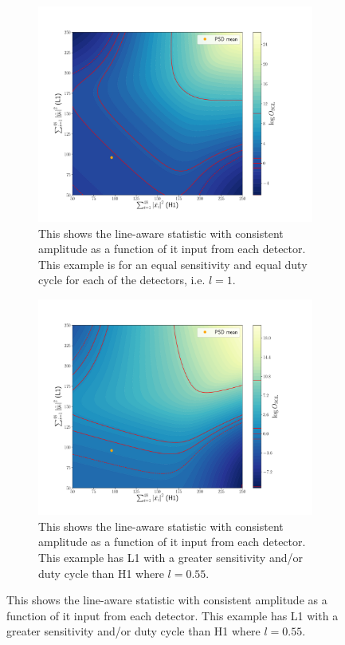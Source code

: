 \begin{figure}
\centering

\begin{subfigure}[h]{\linewidth}
\begin{minipage}{0.65\linewidth}
\includegraphics[width=0.9\linewidth]{C3_soap/lookup_3d_2.pdf}
\end{minipage}\hfill
\begin{minipage}{0.35\linewidth}
\caption{This shows the line-aware statistic with consistent amplitude as a function of it input from each detector. This example is for an equal sensitivity and equal duty cycle for each of the detectors, i.e. $l=1$.}
\label{soap:lineawareamp:plot:noline}
\end{minipage}
\end{subfigure}
\begin{subfigure}[h]{\linewidth}
\begin{minipage}{0.65\linewidth}
\includegraphics[width=0.9\columnwidth]{C3_soap/lookup_3d_1.pdf}
\end{minipage}\hfill
\begin{minipage}{0.35\linewidth}
\caption{This shows the line-aware statistic with consistent amplitude as a function of it input from each detector. This example has L1 with a greater sensitivity and/or duty cycle than H1 where $l=0.55$. }
\label{soap:lineawareamp:plot:linesmall}
\end{minipage}
\end{subfigure}


\end{figure}
